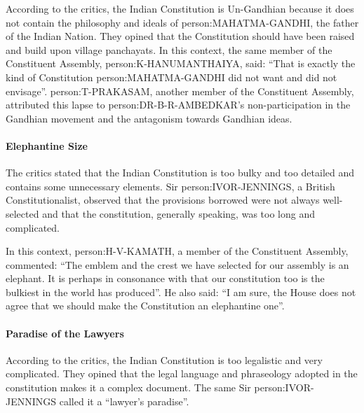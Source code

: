 According to the critics, the Indian Constitution is Un-Gandhian because it does not contain the philosophy and ideals of \gls{person:MAHATMA-GANDHI}, the father of the Indian Nation. They opined that the Constitution should have been raised and build upon village panchayats. In this context, the same member of the Constituent Assembly, \gls{person:K-HANUMANTHAIYA}, said: ``That is exactly the kind of Constitution \gls{person:MAHATMA-GANDHI} did not want and did not envisage''. \gls{person:T-PRAKASAM}, another member of the Constituent Assembly, attributed this lapse to \gls{person:DR-B-R-AMBEDKAR}'s non-participation in the Gandhian movement and the antagonism towards Gandhian ideas.

\paragraph{Elephantine Size}

The critics stated that the Indian Constitution is too bulky and too detailed and contains some unnecessary elements. Sir \gls{person:IVOR-JENNINGS}, a British Constitutionalist, observed that the provisions borrowed were not always well-selected and that the constitution, generally speaking, was too long and complicated.

In this context, \gls{person:H-V-KAMATH}, a member of the Constituent Assembly, commented: ``The emblem and the crest we have selected for our assembly is an elephant. It is perhaps in consonance with that our constitution too is the bulkiest in the world has produced''. He also said: ``I am sure, the House does not agree that we should make the Constitution an elephantine one''.

\paragraph{Paradise of the Lawyers}

According to the critics, the Indian Constitution is too legalistic and very complicated. They opined that the legal language and phraseology adopted in the constitution makes it a complex document. The same Sir \gls{person:IVOR-JENNINGS} called it a ``lawyer's paradise''.

